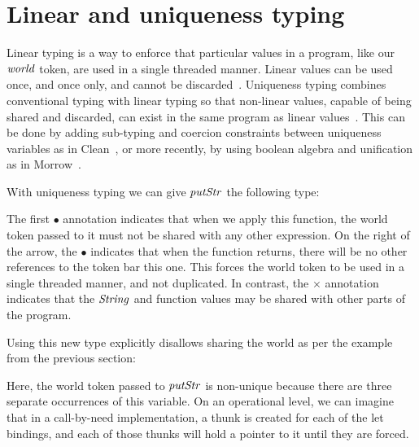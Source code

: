 \section{Linear and uniqueness typing}

Linear typing is a way to enforce that particular values in a program, like our $\operatorname{\mathit{world}}$ token, are used in a single threaded manner. Linear values can be used once, and once only, and cannot be discarded~\cite{wadler:linear-types}. Uniqueness typing combines conventional typing with linear typing so that non-linear values, capable of being shared and discarded, can exist in the same program as linear values~\cite{barendsen:uniqueness}. This can be done by adding sub-typing and coercion constraints between uniqueness variables as in Clean~\cite{barendsen:conventional-and-uniqueness}, or more recently, by using boolean algebra and unification as in Morrow~\cite{vries:uniqueness-typing-simplified}.

With uniqueness typing we can give $\operatorname{\mathit{putStr}}$ the following type:

\code{
	$\iputStr :: \iString^\times \lfuna{\times} \iWorld^\bullet \lfuna{\times} \iWorld^\bullet$
}

The first $\bullet$ annotation indicates that when we apply this function, the world token passed to it must not be shared with any other expression. On the right of the arrow, the $\bullet$ indicates that when the function returns, there will be no other references to the token bar this one. This forces the world token to be used in a single threaded manner, and not duplicated. In contrast, the $\times$ annotation indicates that the $\operatorname{\mathit{String}}$ and function values may be shared with other parts of the program. 

Using this new type explicitly disallows sharing the world as per the example from the previous section:


Here, the world token passed to $\operatorname{\mathit{putStr}}$ is non-unique because there are three separate occurrences of this variable. On an operational level, we can imagine that in a call-by-need implementation, a thunk is created for each of the let bindings, and each of those thunks will hold a pointer to it until they are forced.

